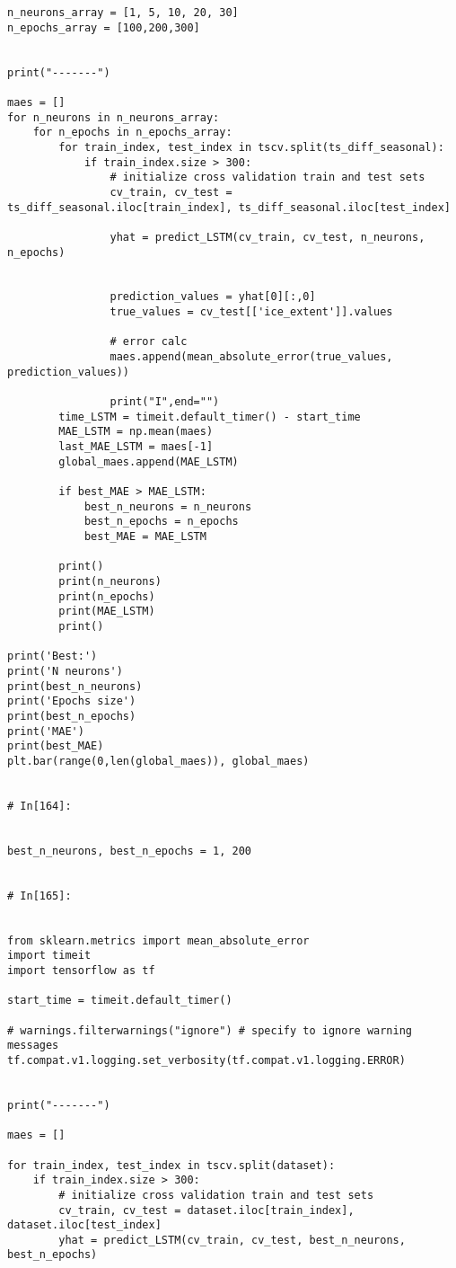 \begin{verbatim}
n_neurons_array = [1, 5, 10, 20, 30]
n_epochs_array = [100,200,300]


print("-------")

maes = []
for n_neurons in n_neurons_array:
    for n_epochs in n_epochs_array:
        for train_index, test_index in tscv.split(ts_diff_seasonal):
            if train_index.size > 300:
                # initialize cross validation train and test sets
                cv_train, cv_test = ts_diff_seasonal.iloc[train_index], ts_diff_seasonal.iloc[test_index]

                yhat = predict_LSTM(cv_train, cv_test, n_neurons, n_epochs)


                prediction_values = yhat[0][:,0]
                true_values = cv_test[['ice_extent']].values

                # error calc
                maes.append(mean_absolute_error(true_values, prediction_values))

                print("I",end="")
        time_LSTM = timeit.default_timer() - start_time
        MAE_LSTM = np.mean(maes)
        last_MAE_LSTM = maes[-1]
        global_maes.append(MAE_LSTM)

        if best_MAE > MAE_LSTM:
            best_n_neurons = n_neurons
            best_n_epochs = n_epochs
            best_MAE = MAE_LSTM

        print()
        print(n_neurons)
        print(n_epochs)
        print(MAE_LSTM)
        print()    

print('Best:')
print('N neurons')
print(best_n_neurons)
print('Epochs size')
print(best_n_epochs)
print('MAE')
print(best_MAE)
plt.bar(range(0,len(global_maes)), global_maes)


# In[164]:


best_n_neurons, best_n_epochs = 1, 200


# In[165]:


from sklearn.metrics import mean_absolute_error
import timeit
import tensorflow as tf

start_time = timeit.default_timer()

# warnings.filterwarnings("ignore") # specify to ignore warning messages
tf.compat.v1.logging.set_verbosity(tf.compat.v1.logging.ERROR)


print("-------")

maes = []

for train_index, test_index in tscv.split(dataset):
    if train_index.size > 300:
        # initialize cross validation train and test sets
        cv_train, cv_test = dataset.iloc[train_index], dataset.iloc[test_index]
        yhat = predict_LSTM(cv_train, cv_test, best_n_neurons, best_n_epochs)



\end{verbatim}
